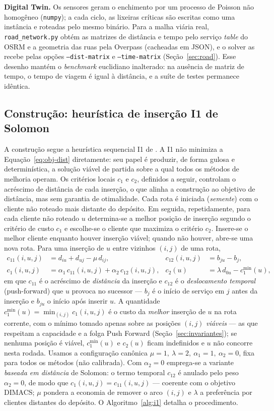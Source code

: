 \documentclass[12pt, a4paper]{article}
\begin{document}
\textbf{Digital Twin.} Os sensores geram o enchimento por um processo de Poisson não homogêneo (\texttt{numpy}); a cada ciclo, as lixeiras críticas são escritas como uma instância e roteadas pelo mesmo binário. Para a malha viária real, \texttt{road\_network.py} obtém as matrizes de distância e tempo pelo serviço \emph{table} do OSRM e a geometria das ruas pela Overpass (cacheadas em JSON), e o solver as recebe pelas opções \texttt{--dist-matrix} e \texttt{--time-matrix} (Seção~\ref{sec:road}). Esse desenho mantém o \textit{benchmark} euclidiano inalterado: na ausência de matriz de tempo, o tempo de viagem é igual à distância, e a suíte de testes permanece idêntica.

\subsection{Construção: heurística de inserção I1 de Solomon}\label{sec:i1}
A construção segue a heurística sequencial I1 de \citet{solomon1987algorithms}. A I1 não minimiza a Equação~\eqref{eq:obj-dist} diretamente: seu papel é produzir, de forma gulosa e determinística, a solução viável de partida sobre a qual todos os métodos de melhoria operam. Os critérios locais $c_1$ e $c_2$, definidos a seguir, controlam o acréscimo de distância de cada inserção, o que alinha a construção ao objetivo de distância, mas sem garantia de otimalidade. Cada rota é iniciada (\emph{semente}) com o cliente não roteado mais distante do depósito. Em seguida, repetidamente, para cada cliente não roteado $u$ determina-se a melhor posição de inserção segundo o critério de custo $c_1$ e escolhe-se o cliente que maximiza o critério $c_2$. Insere-se o melhor cliente enquanto houver inserção viável; quando não houver, abre-se uma nova rota. Para uma inserção de $u$ entre vizinhos $(i,j)$ de uma rota,
\begin{align}
c_{11}(i,u,j) &= d_{iu}+d_{uj}-\mu\,d_{ij}, & c_{12}(i,u,j) &= b_{ju}-b_{j},\\
c_{1}(i,u,j) &= \alpha_1\, c_{11}(i,u,j) + \alpha_2\, c_{12}(i,u,j), & c_{2}(u) &= \lambda\, d_{0u} - c_1^{\min}(u),
\end{align}
em que $c_{11}$ é o acréscimo de \emph{distância} da inserção e $c_{12}$ é o \emph{deslocamento temporal} (push-forward) que $u$ provoca no sucessor --- $b_j$ é o início de serviço em $j$ antes da inserção e $b_{ju}$ o início após inserir $u$. A quantidade $c_1^{\min}(u)=\min_{(i,j)} c_1(i,u,j)$ é o custo da \emph{melhor} inserção de $u$ na rota corrente, com o mínimo tomado apenas sobre as posições $(i,j)$ \emph{viáveis} --- as que respeitam a capacidade e a folga Push Forward (Seção~\ref{sec:invariantes}); se nenhuma posição é viável, $c_1^{\min}(u)$ e $c_2(u)$ ficam indefinidos e $u$ não concorre nesta rodada. Usamos a configuração canônica $\mu=1,\ \lambda=2,\ \alpha_1=1,\ \alpha_2=0$, fixa para todos os métodos (não calibrada). Com $\alpha_2=0$ emprega-se a variante \emph{baseada em distância} de Solomon: o termo temporal $c_{12}$ é anulado pelo peso $\alpha_2=0$, de modo que $c_1(i,u,j)=c_{11}(i,u,j)$ --- coerente com o objetivo DIMACS; $\mu$ pondera a economia de remover o arco $(i,j)$ e $\lambda$ a preferência por clientes distantes do depósito. O Algoritmo~\ref{alg:i1} detalha o procedimento.
\end{document}
